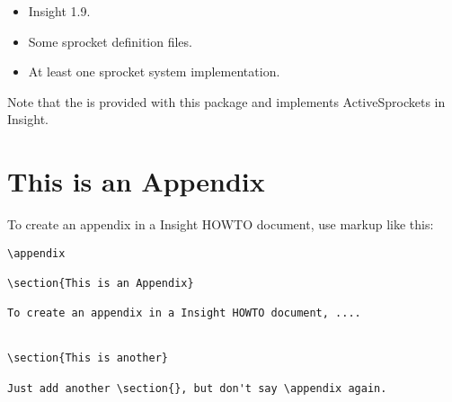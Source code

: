\documentclass{InsightArticle}
\begin{document}
\begin{itemize}
  \item  Insight 1.9.
  \item  Some sprocket definition files.
  \item  At least one sprocket system implementation.
\end{itemize}

Note that the  is provided with this package and
implements ActiveSprockets in Insight.





\appendix

\section{This is an Appendix}

To create an appendix in a Insight HOWTO document, use markup like
this:

\begin{verbatim}
\appendix

\section{This is an Appendix}

To create an appendix in a Insight HOWTO document, ....


\section{This is another}

Just add another \section{}, but don't say \appendix again.
\end{verbatim}
\end{document}

